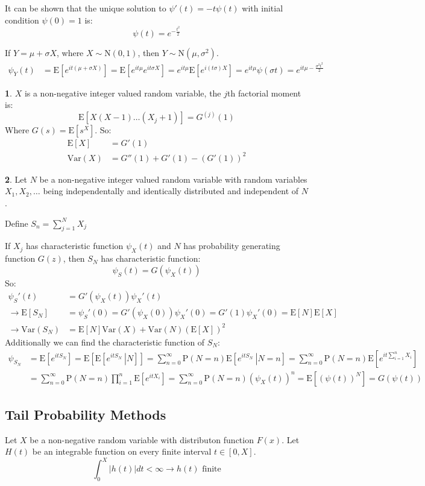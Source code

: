 \documentclass[english,12pt]{article}
\theoremstyle{plain}
\theoremstyle{definition}
\newtheorem*{example}{\protect\examplename}
\theoremstyle{definition} %
\newcommand{\eg}[1]{\begin{example} #1 \end{example} }
\providecommand{\examplename}{Example}
\newcommand{\brac}[1]{\left(#1\right)} %
\newcommand{\sqbrac}[1]{\left[#1\right]} %
\newcommand{\ex}[1]{\mbox{E} \left[ #1 \right]}
\newcommand{\var}[1]{\mbox{Var} \left( #1 \right)}
\newcommand{\condex}[2]{\mbox{E} \left[ \left. #1 \ \right\vert \left. #2 \right. \right]}
\begin{document}
{It can be shown that the unique solution to $\psi'(t)=-t\psi(t)$ with initial condition $\psi(0)=1$ is:
\[\psi(t)=e^{-\frac{t^2}{2}}\]

If $Y=\mu+\sigma X$, where $X\sim\text{N}(0,1)$, then $Y\sim \text{N}(\mu,\sigma^2)$.
\begin{align*}
\psi_Y(t)&=\ex{e^{it(\mu+\sigma X)}}
=\ex{e^{it\mu}e^{it\sigma X}}
=e^{it\mu}\ex{e^{i(t\sigma)X}}
=e^{it\mu}\psi(\sigma t)
=e^{it\mu-\frac{\sigma^2t^2}{2}}
\end{align*}
}

\eg{
$X$ is a non-negative integer valued random variable, the $j$th factorial moment is:
\[\ex{X(X-1)\ldots(X_j+1)}=G^{(j)}(1)\]
Where $G(s)=\ex{s^X}$.
So:
\begin{align*}
\ex{X}&=G'(1)\\
\var{X}&=G''(1)+G'(1)-\brac{G'(1)}^2
\end{align*}
}

\eg{
Let $N$ be a non-negative integer valued random variable with random variables $X_1,X_2,\ldots$ being independentally and identically distributed and independent of $N$.

Define $S_n=\sum\limits_{j=1}^NX_j$

If $X_j$ has characteristic function $\psi_X(t)$ and $N$ has probability generating function $G(z)$, then $S_N$ has characteristic function:
\[\psi_S(t)=G(\psi_X(t))\]
So:
\begin{align*}
\psi_S'(t)&=G'(\psi_X(t))\psi_X'(t)\\
\rightarrow \ex{S_N}
&=\psi_S'(0)
=G'(\psi_X(0))\psi_X'(0)
=G'(1)\psi_X'(0)
=\ex{N}\ex{X}\\
\rightarrow \var{S_N}&=\ex{N}\var{X}+\var{N}(\ex{X})^2
\end{align*}
Additionally we can find the characteristic function of $S_N$:
\begin{align*}
\psi_{S_N}&=\ex{e^{itS_N}}
=\ex{\condex{e^{itS_N}}{N}}
=\sum\limits_{n=0}^\infty \text{P}(N=n)\condex{e^{itS_N}}{N=n}
=\sum\limits_{n=0}^\infty \text{P}(N=n)\ex{e^{it\sum\limits_{i=1}^nX_i}}\\
&=\sum\limits_{n=0}^\infty \text{P}(N=n)\prod\limits_{i=1}^n\ex{e^{itX_i}}
=\sum\limits_{n=0}^\infty \text{P}(N=n)(\psi_X(t))^n
=\ex{(\psi(t))^N}
=G(\psi(t))
\end{align*}
}

\subsection{Tail Probability Methods}
Let $X$ be a non-negative random variable with distributon function $F(x)$.  Let $H(t)$ be an integrable function on every finite interval $t\in\sqbrac{0,X}$.
\[\int_0^X|h(t)|dt<\infty\rightarrow h(t)\text{ finite}\]
\end{document}
